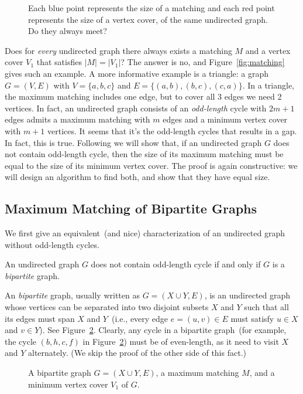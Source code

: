 \begin{figure}[h]
\centering{}
\caption{Each blue point represents the size of a matching and each red point represents the size of a vertex cover,
of the same undirected graph. Do they always meet?}
\label{fig:meet}
\end{figure}

Does for \emph{every} undirected graph there always exists a matching $M$ and a 
vertex cover $V_1$ that satisfies $|M| = |V_1|$?
The answer is no, and Figure~\ref{fig:matching} gives such an example.
A more informative example is a triangle: a graph $G = (V, E)$ with $V = \{a,b,c\}$ and $E = \{(a,b), (b,c), (c,a)\}$.
In a triangle, the maximum matching includes one edge, but to cover all 3 edges we need 2 vertices.
In fact, an undirected graph consists of an \emph{odd-length} cycle with $2m+1$ edges admits
a maximum matching with $m$ edges and a minimum vertex cover with $m+1$ vertices.
It seems that it's the odd-length cycles that results in a gap.
In fact, this is true. Following we will show that, if an undirected
graph $G$ does not contain odd-length cycle, then the size of its maximum matching
must be equal to the size of its minimum vertex cover. The proof is again constructive:
we will design an algorithm to find both, and show that they have equal size.


\subsection*{Maximum Matching of Bipartite Graphs}

We first give an equivalent~(and nice) characterization of an undirected graph without odd-length cycles.
\begin{fact}
An undirected graph $G$ does not contain odd-length cycle if and only if $G$ is a \emph{bipartite} graph.
\end{fact}

An \emph{bipartite} graph, usually written as $G = (X\cup Y, E)$, is an undirected graph
whose vertices can be separated into two disjoint subsets $X$ and $Y$ such that all its edges
must span $X$ and $Y$~(i.e., every edge $e = (u,v)\in E$ must satisfy $u\in X$ and $v\in Y$).
See Figure~\ref{fig:bipartite}.
Clearly, any cycle in a bipartite graph~(for example, the cycle $(b,h,c,f)$ in Figure~\ref{fig:bipartite})
must be of even-length, as it need to visit $X$ and $Y$ alternately.
(We skip the proof of the other side of this fact.)

\begin{figure}[h]
\centering{}
\caption{A bipartite graph $G = (X\cup Y, E)$, 
a maximum matching $M$, and a minimum vertex cover $V_1$ of $G$.  }
\label{fig:bipartite}
\end{figure}

